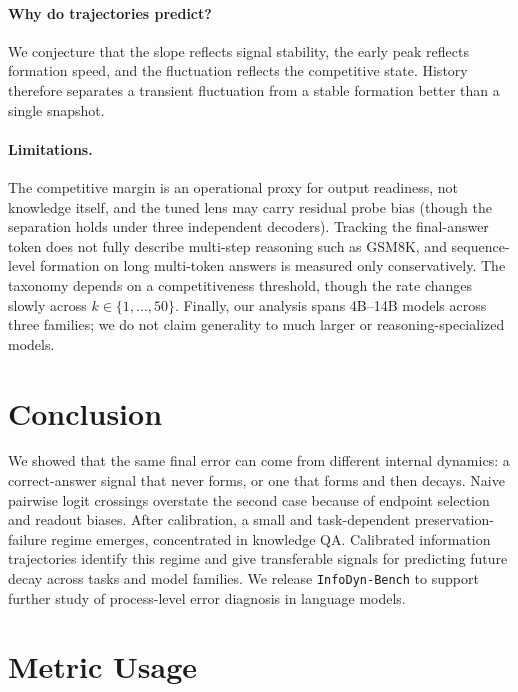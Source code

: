 \documentclass{article} %
\begin{document}
\paragraph{Why do trajectories predict?}
We conjecture that the slope reflects signal stability, the early peak reflects formation speed, and the fluctuation reflects the competitive state. History therefore separates a transient fluctuation from a stable formation better than a single snapshot.

\paragraph{Limitations.}
The competitive margin is an operational proxy for output readiness, not knowledge itself, and the tuned lens may carry residual probe bias (though the separation holds under three independent decoders). Tracking the final-answer token does not fully describe multi-step reasoning such as GSM8K, and sequence-level formation on long multi-token answers is measured only conservatively. The taxonomy depends on a competitiveness threshold, though the rate changes slowly across $k \in \{1,\ldots,50\}$. Finally, our analysis spans 4B--14B models across three families; we do not claim generality to much larger or reasoning-specialized models.

\section{Conclusion}

We showed that the same final error can come from different internal dynamics: a correct-answer signal that never forms, or one that forms and then decays. Naive pairwise logit crossings overstate the second case because of endpoint selection and readout biases. After calibration, a small and task-dependent preservation-failure regime emerges, concentrated in knowledge QA. Calibrated information trajectories identify this regime and give transferable signals for predicting future decay across tasks and model families. We release \texttt{InfoDyn-Bench} to support further study of process-level error diagnosis in language models.




\appendix

\section{Metric Usage}
\label{app:metric}
\end{document}

